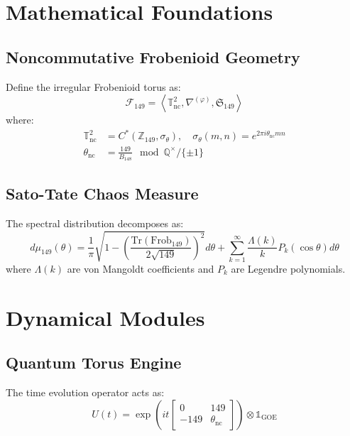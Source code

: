 \documentclass[12pt]{article}
\begin{document}
\section{Mathematical Foundations}
\subsection{Noncommutative Frobenioid Geometry}
Define the irregular Frobenioid torus as:
\begin{equation}
\mathcal{F}_{149} = \left\langle \mathbb{T}^2_{\text{nc}}, \nabla^{(\varphi)}, \mathfrak{S}_{149}\right\rangle
\end{equation}
where:
\begin{align*}
\mathbb{T}^2_{\text{nc}} &= C^*( \mathbb{Z}_{149}, \sigma_\theta), \quad \sigma_\theta(m,n) = e^{2\pi i\theta_{\text{nc}}mn} \\
\theta_{\text{nc}} &= \frac{149}{B_{148}} \mod \mathbb{Q}^\times/\{\pm1\}
\end{align*}

\subsection{Sato-Tate Chaos Measure}
The spectral distribution decomposes as:
\begin{equation}
d\mu_{149}(\theta) = \frac{1}{\pi}\sqrt{1 - \left(\frac{\text{Tr}(\text{Frob}_{149})}{2\sqrt{149}}\right)^2}d\theta + \sum_{k=1}^\infty \frac{\Lambda(k)}{k}P_k(\cos\theta)d\theta
\end{equation}
where $\Lambda(k)$ are von Mangoldt coefficients and $P_k$ are Legendre polynomials.

\section{Dynamical Modules}
\subsection{Quantum Torus Engine}
The time evolution operator acts as:
\begin{equation}
U(t) = \exp\left(it\left[\begin{array}{cc}
0 & 149 \\
-149 & \theta_{\text{nc}}
\end{array}\right]\right) \otimes \mathbb{1}_{\text{GOE}}
\end{equation}

\end{document}

